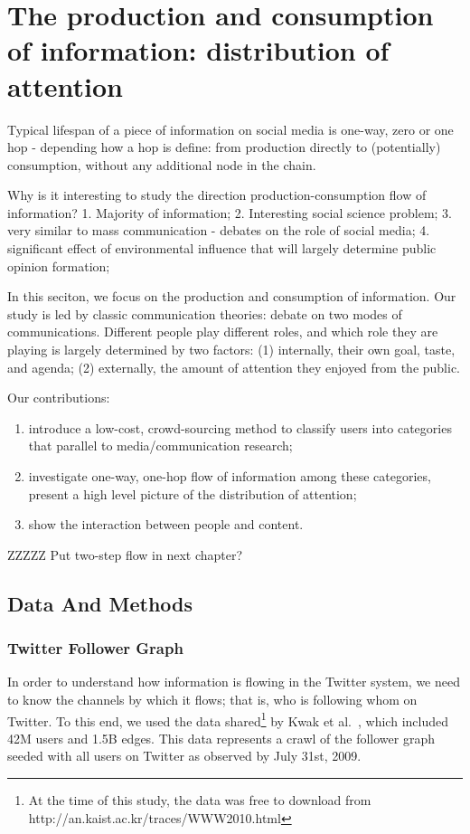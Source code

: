 \documentclass[phd,tocprelim]{cornell}
\begin{document}
\section{The production and consumption of information: distribution of attention}

Typical lifespan of a piece of information on social media is one-way, zero or one hop - depending how a hop is define: from production directly to (potentially) consumption, without any additional node in the chain.

Why is it interesting to study the direction production-consumption flow of information? 1. Majority of information; 2. Interesting social science problem; 3. very similar to mass communication - debates on the role of social media; 4. significant effect of environmental influence that will largely determine public opinion formation; 

In this seciton, we focus on the production and consumption of information. Our study is led by classic communication theories: debate on two modes of communications. Different people play different roles, and which role they are playing is largely determined by two factors: (1) internally, their own goal, taste, and agenda; (2) externally, the amount of attention they enjoyed from the public. 

Our contributions:
\begin{enumerate}
\item introduce a low-cost, crowd-sourcing method to classify users into categories that parallel to media/communication research;
\item investigate one-way, one-hop flow of information among these categories, present a high level picture of the distribution of attention;
\item show the interaction between people and content. 
\end{enumerate}

ZZZZZ Put two-step flow in next chapter?

\subsection{Data And Methods}
\subsubsection{Twitter Follower Graph}
\label{sec:follower}
In order to understand how information is flowing in the Twitter system, we
need to know the channels by which it flows; that is, who is following whom
on Twitter.  To this end, we used the data shared\footnote{At the time of this study, the data was free to download from http://an.kaist.ac.kr/traces/WWW2010.html} by Kwak et al.~\cite{kwak_10}, which included 42M users and 1.5B edges.  This data
represents a crawl of the follower graph seeded with all users on Twitter as observed by July 31st, 2009.
\end{document}
